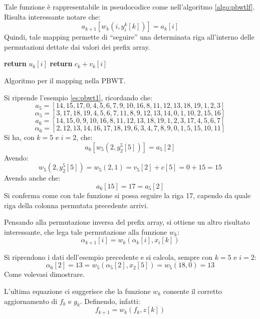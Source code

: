 Tale funzione è rappresentabile in pseudocodice come nell'algoritmo
\ref{algo:pbwtlf}. \\
Risulta interessante notare che:
\begin{equation}
  \label{eq:pbwt3}
  a_{k+1}\left[w_k\left(i,y_i^k[k]\right)\right]=a_k[i]
\end{equation}
Quindi, tale mapping permette di ``seguire'' una determinata riga
all'interno delle permutazioni dettate dai valori dei prefix array.
\begin{algorithm}
  \small
  \begin{algorithmic}[1]
    \State \textbf{return} $u_k[i]$
    \Else
    \State \textbf{return} $c_k+v_k[i]$
    \EndIf
    \EndFunction
  \end{algorithmic}
  \caption{Algoritmo per il mapping nella PBWT.}
  \label{algo:pbwtlf}
\end{algorithm}
\begin{esempio}
  Si riprende l'esempio
  \ref{es:pbwt1}, ricordando che:
  \[a_5=[14,15,17,0,4,5,6,7,9,10,16,8,11,12,13,18,19,1,2,3]\]
  \[\alpha_5=[3,17,18,19,4,5,6,7,11,8,9,12,13,14,0,1,10,2,15,16]\]
  \[a_6=[14,15,0,9,10,16,8,11,12,13,18,19,1,2,3,17,4,5,6,7]\]
  \[\alpha_6=[2,12,13,14,16,17,18,19,6,3,4,7,8,9,0,1,5,15,10,11]\]
  Si ha, con $k=5$ e $i=2$, che:
  \[a_{6}\left[w_5\left(2,y_2^5[5]\right)\right]=a_5[2]\]
  Avendo:
  \[w_5\left(2,y_2^5[5]\right)=w_5\left(2,1\right)=v_5[2]+c[5]=0+15=15\]
  Avendo anche che:
  \[a_{6}[15]=17=a_5[2]\]
  Si conferma come con tale funzione si possa seguire la riga 17,
  capendo da quale riga della colonna permutata precedente arrivi.
\end{esempio}
\noindent
Pensando alla permutazione inversa del prefix array, si
ottiene un altro risultato interessante, che lega tale permutazione alla
funzione $w_k$:
\begin{equation}
  \label{eq:pbwtw4}
  \alpha_{k+1}[i]=w_k(\alpha_k[i],x_i[k])
\end{equation}
\begin{esempio}
  Si riprendono i dati dell'esempio precedente e si calcola, sempre con
  $k=5$ e $i=2$:
  \[\alpha_{6}[2]=13=w_5(\alpha_5[2],x_2[5])=w_5(18,0)=13\]
  Come volevasi dimostrare.
\end{esempio}
L'ultima equazione ci suggerisce che la funzione $w_k$
consente il corretto aggiornamento di $f_k$ e $g_k$.
Definendo, infatti:
\begin{equation}
  \label{eq:pbwtq5}
  f_{k+1}=w_k(f_k,z[k])
\end{equation}
